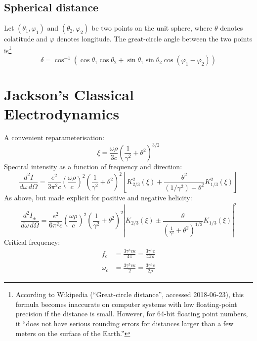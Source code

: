 \documentclass{article}
\newcommand{\phase}{\varphi}
\begin{document}
\subsection{Spherical distance}

Let $(\theta_1,\phase_1)$ and $(\theta_2,\phase_2)$ be two points on the unit sphere, where $\theta$ denotes colatitude and $\phase$ denotes longitude.
The great-circle angle between the two points is\footnote{According to Wikipedia (``Great-circle distance'', accessed 2018-06-23), this formula becomes inaccurate on computer systems with low floating-point precision if the distance is small. However, for 64-bit floating point numbers, it ``does not have serious rounding errors for distances larger than a few meters on the surface of the Earth.''}
\begin{equation}
    \delta = \cos^{-1}(\cos\theta_1 \cos\theta_2 + \sin\theta_1 \sin\theta_2 \cos(\phase_1 - \phase_2))
\end{equation}

\section{Jackson's Classical Electrodynamics}

A convenient reparameterisation:
\begin{equation}
    \xi = \frac{\omega\rho}{3c}\left(\frac{1}{\gamma^2} + \theta^2\right)^{3/2}
    \tag{J14.76}
\end{equation}
Spectral intensity as a function of frequency and direction:
\begin{equation}
    \frac{d^2I}{d\omega\,d\Omega} =
        \frac{e^2}{3\pi^2c}
        \left( \frac{\omega\rho}{c} \right)^2
        \left( \frac{1}{\gamma^2} + \theta^2 \right)^2
        \left[ K_{2/3}^2(\xi) + \frac{\theta^2}{(1/\gamma^2) + \theta^2} K_{1/3}^2(\xi) \right]
    \tag{J14.79}
\end{equation}
As above, but made explicit for positive and negative helicity:
\begin{equation}
    \frac{d^2I_\pm}{d\omega\,d\Omega} =
        \frac{e^2}{6\pi^2c}
        \left( \frac{\omega\rho}{c} \right)^2
        \left( \frac{1}{\gamma^2} + \theta^2 \right)^2
        \left| K_{2/3}(\xi) \pm \frac{\theta}{\left(\frac{1}{\gamma^2} + \theta^2\right)^{1/2}} K_{1/3}(\xi) \right|^2
    \tag{J Problem 14.25}
    \label{eqn:JP14_25}
\end{equation}
Critical frequency:
\begin{equation}
    \begin{aligned}
        f_c &= \frac{3\gamma^3 c\kappa}{4\pi}
             = \frac{3\gamma^3 c}{4\pi\rho} \\
        \omega_c &= \frac{3\gamma^3 c\kappa}{2}
                  = \frac{3\gamma^3 c}{2\rho}
    \end{aligned}
    \tag{J14.81}
\end{equation}
\end{document}
